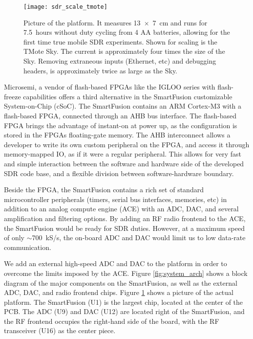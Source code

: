 \begin{figure}[th]
\texttt{[image: sdr\_scale\_tmote]}
\caption{Picture of the \sdr platform. It measures 13~$\times$~7~cm and runs
for 7.5~hours without duty cycling from 4 AA batteries, allowing for the first
time true mobile SDR experiments. Shown for scaling is the TMote Sky. The
current \sdr is approximately four times the size of the Sky. Removing
extraneous inputs (Ethernet, etc) and debugging headers, \sdr is approximately
twice as large as the Sky.}
\label{fig:usdr}
\end{figure}

Microsemi, a vendor of flash-based FPGAs like the IGLOO series with
flash-freeze capabilities \cite{igloo} offers a third alternative in the
SmartFusion customizable System-on-Chip (cSoC). The SmartFusion contains an
ARM Cortex-M3 with a flash-based FPGA, connected through an AHB bus interface.
The flash-based FPGA brings the advantage of instant-on at power up, as the
configuration is stored in the FPGAs floating-gate memory. The AHB
interconnect allows a developer to write its own custom peripheral on the
FPGA, and access it through memory-mapped IO, as if it were a regular
peripheral. This allows for very fast and simple interaction between the
software and hardware side of the developed SDR code base, and a flexible
division between software-hardware boundary.

Beside the FPGA, the SmartFusion contains a rich set of standard
microcontroller peripherals (timers, serial bus interfaces, memories, etc) in
addition to an analog compute engine (ACE) with an ADC, DAC, and several
amplification and filtering options. By adding an RF radio frontend to the
ACE, the SmartFusion would be ready for SDR duties. However, at a maximum
speed of only $\sim$700~kS/s, the on-board ADC and DAC would limit us to low
data-rate communication.

We add an external high-speed ADC and DAC to the \sdr platform in order to
overcome the limits imposed by the ACE. Figure \ref{fig:system_arch} shows a
block diagram of the major components on the SmartFusion, as well as the
external ADC, DAC, and radio frontend chips. Figure \ref{fig:usdr} shows a
picture of the actual platform. The SmartFusion (U1) is the largest chip, located
at the center of the PCB. The ADC (U9) and DAC (U12) are located right of the
SmartFusion, and the RF frontend occupies the right-hand side of the board,
with the RF transceiver (U16) as the center piece.

